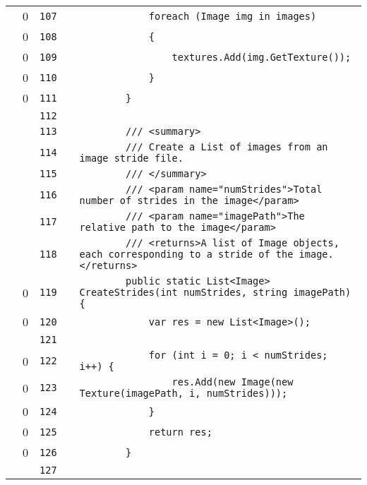 \documentclass[a4paper,landscape,10pt]{article}
\begin{document}
\begin{longtable}[l]{lrrll}
\cellcolor{red} & 0 & \verb~107~ & & \verb~            foreach (Image img in images)~\\
\cellcolor{red} & 0 & \verb~108~ & & \verb~            {~\\
\cellcolor{red} & 0 & \verb~109~ & & \verb~                textures.Add(img.GetTexture());~\\
\cellcolor{red} & 0 & \verb~110~ & & \verb~            }~\\
\cellcolor{red} & 0 & \verb~111~ & & \verb~        }~\\
\cellcolor{gray} &  & \verb~112~ & & \verb~~\\
\cellcolor{gray} &  & \verb~113~ & & \verb~        /// <summary>~\\
\cellcolor{gray} &  & \verb~114~ & & \verb~        /// Create a List of images from an image stride file.~\\
\cellcolor{gray} &  & \verb~115~ & & \verb~        /// </summary>~\\
\cellcolor{gray} &  & \verb~116~ & & \verb~        /// <param name="numStrides">Total number of strides in the image</param>~\\
\cellcolor{gray} &  & \verb~117~ & & \verb~        /// <param name="imagePath">The relative path to the image</param>~\\
\cellcolor{gray} &  & \verb~118~ & & \verb~        /// <returns>A list of Image objects, each corresponding to a stride of the image.</returns>~\\
\cellcolor{red} & 0 & \verb~119~ & & \verb~        public static List<Image> CreateStrides(int numStrides, string imagePath) {~\\
\cellcolor{red} & 0 & \verb~120~ & & \verb~            var res = new List<Image>();~\\
\cellcolor{gray} &  & \verb~121~ & & \verb~~\\
\cellcolor{red} & 0 & \verb~122~ & & \verb~            for (int i = 0; i < numStrides; i++) {~\\
\cellcolor{red} & 0 & \verb~123~ & & \verb~                res.Add(new Image(new Texture(imagePath, i, numStrides)));~\\
\cellcolor{red} & 0 & \verb~124~ & & \verb~            }~\\
\cellcolor{red} & 0 & \verb~125~ & & \verb~            return res;~\\
\cellcolor{red} & 0 & \verb~126~ & & \verb~        }~\\
\cellcolor{gray} &  & \verb~127~ & & \verb~~\\

\end{longtable}
\end{document}
